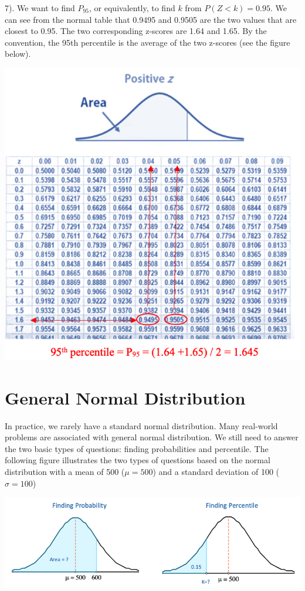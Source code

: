 \documentclass[
]{book}
\begin{document}
7). We want to find \(P_{95}\), or equivalently, to find \(k\) from \(P(Z < k) = 0.95\). We can see from the normal table that 0.9495 and 0.9505 are the two values that are closest to 0.95. The two corresponding z-scores are 1.64 and 1.65. By the convention, the 95th percentile is the average of the two z-scores (see the figure below).

\begin{center}\includegraphics[width=0.6\linewidth]{week04/example05-7} \end{center}

\hfill\break

\hfill\break

\hypertarget{general-normal-distribution}{%
\section{General Normal Distribution}\label{general-normal-distribution}}

\hfill\break

In practice, we rarely have a standard normal distribution. Many real-world problems are associated with general normal distribution. We still need to answer the two basic types of questions: finding probabilities and percentile. The following figure illustrates the two types of questions based on the normal distribution with a mean of 500 (\(\mu = 500\)) and a standard deviation of 100 (\(\sigma = 100\))

\begin{center}\includegraphics[width=0.6\linewidth]{week04/twoTypeQuestions} \end{center}
\end{document}
